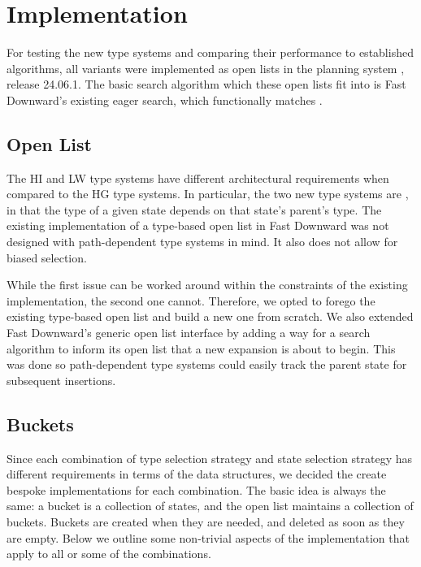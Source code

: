 \chapter{Implementation}

For testing the new type systems and comparing their performance to established algorithms, all variants were implemented as open lists in the  planning system , release 24.06.1. The basic search algorithm which these open lists fit into is Fast Downward's existing eager search, which functionally matches .

\section{Open List}
\label{sec:impl-ol}

The HI and LW type systems have different architectural requirements when compared to the HG type systems. In particular, the two new type systems are , in that the type of a given state depends on that state's parent's type. The existing implementation of a type-based open list in Fast Downward was not designed with path-dependent type systems in mind. It also does not allow for biased selection.

While the first issue can be worked around within the constraints of the existing implementation, the second one cannot. Therefore, we opted to forego the existing type-based open list and build a new one from scratch. We also extended Fast Downward's generic open list interface by adding a way for a search algorithm to inform its open list that a new expansion is about to begin. This was done so path-dependent type systems could easily track the parent state for subsequent insertions.

\section{Buckets}

Since each combination of type selection strategy and state selection strategy has different requirements in terms of the data structures, we decided the create bespoke implementations for each combination. The basic idea is always the same: a bucket is a collection of states, and the open list maintains a collection of buckets. Buckets are created when they are needed, and deleted as soon as they are empty. Below we outline some non-trivial aspects of the implementation that apply to all or some of the combinations.

